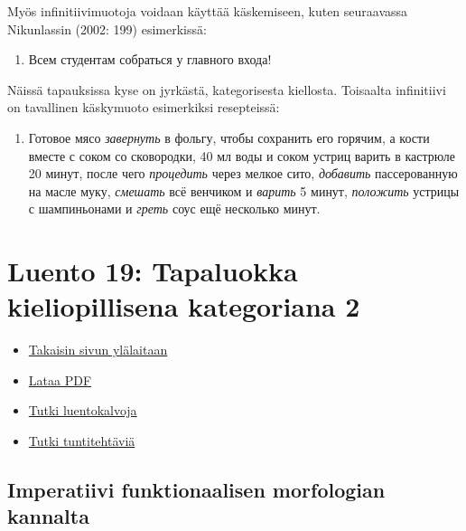 \documentclass[]{scrartcl}
\providecommand{\tightlist}{%
  \setlength{\itemsep}{0pt}\setlength{\parskip}{0pt}}
\begin{document}
Myös infinitiivimuotoja voidaan käyttää käskemiseen, kuten seuraavassa
Nikunlassin (2002: 199) esimerkissä:

\begin{enumerate}
\def\labelenumi{(\arabic{enumi})}
\setcounter{enumi}{360}
\tightlist
\item
  Всем студентам собраться у главного входа!
\end{enumerate}

Näissä tapauksissa kyse on jyrkästä, kategorisesta kiellosta. Toisaalta
infinitiivi on tavallinen käskymuoto esimerkiksi resepteissä:

\begin{enumerate}
\def\labelenumi{(\arabic{enumi})}
\setcounter{enumi}{361}
\tightlist
\item
  Готовое мясо \emph{завернуть} в фольгу, чтобы сохранить его горячим, а
  кости вместе с соком со сковородки, 40 мл воды и соком устриц варить в
  кастрюле 20 минут, после чего \emph{процедить} через мелкое сито,
  \emph{добавить} пассерованную на масле муку, \emph{смешать} всё
  венчиком и \emph{варить} 5 минут, \emph{положить} устрицы с
  шампиньонами и \emph{греть} соус ещё несколько минут.
\end{enumerate}

\section{Luento 19: Tapaluokka kieliopillisena kategoriana
2}\label{luento-19-tapaluokka-kieliopillisena-kategoriana-2}

\begin{itemize}
\tightlist
\item
  \href{https://mustikka.uta.fi/~juho_harme/morfologia/\#tästä-kurssista}{Takaisin
  sivun ylälaitaan}
\item
  \href{http://mustikka.uta.fi/~juho_harme/morfologia/materiaalit/luento19.pdf}{Lataa
  PDF}
\item
  \href{http://mustikka.uta.fi/~juho_harme/morfologia/presentations/luento19.html}{Tutki
  luentokalvoja}
\item
  \href{http://mustikka.uta.fi/~juho_harme/morfologia/tehtavat/luento19.pdf}{Tutki
  tuntitehtäviä}
\end{itemize}

\subsection{Imperatiivi funktionaalisen morfologian
kannalta}\label{imperatiivi-funktionaalisen-morfologian-kannalta}
\end{document}
